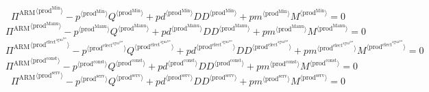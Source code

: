 \begin{equation}
{\Pi^{\mathrm{ARM}}}^{\langle \mathrm{prod}^{\mathrm{Min}}\rangle} - {{p}^{\langle \mathrm{prod}^{\mathrm{Min}}\rangle}} {{Q}^{\langle \mathrm{prod}^{\mathrm{Min}}\rangle}} + {{{p\!d}}^{\langle \mathrm{prod}^{\mathrm{Min}}\rangle}} {{{D\!D}}^{\langle \mathrm{prod}^{\mathrm{Min}}\rangle}} + {{{p\!m}}^{\langle \mathrm{prod}^{\mathrm{Min}}\rangle}} {{M}^{\langle \mathrm{prod}^{\mathrm{Min}}\rangle}} = 0
\end{equation}
\begin{equation}
{\Pi^{\mathrm{ARM}}}^{\langle \mathrm{prod}^{\mathrm{Manu}}\rangle} - {{p}^{\langle \mathrm{prod}^{\mathrm{Manu}}\rangle}} {{Q}^{\langle \mathrm{prod}^{\mathrm{Manu}}\rangle}} + {{{p\!d}}^{\langle \mathrm{prod}^{\mathrm{Manu}}\rangle}} {{{D\!D}}^{\langle \mathrm{prod}^{\mathrm{Manu}}\rangle}} + {{{p\!m}}^{\langle \mathrm{prod}^{\mathrm{Manu}}\rangle}} {{M}^{\langle \mathrm{prod}^{\mathrm{Manu}}\rangle}} = 0
\end{equation}
\begin{equation}
{\Pi^{\mathrm{ARM}}}^{\langle \mathrm{prod}^{\mathrm{elect}^{\mathrm{agua}^{\mathrm{gas}}}}\rangle} - {{p}^{\langle \mathrm{prod}^{\mathrm{elect}^{\mathrm{agua}^{\mathrm{gas}}}}\rangle}} {{Q}^{\langle \mathrm{prod}^{\mathrm{elect}^{\mathrm{agua}^{\mathrm{gas}}}}\rangle}} + {{{p\!d}}^{\langle \mathrm{prod}^{\mathrm{elect}^{\mathrm{agua}^{\mathrm{gas}}}}\rangle}} {{{D\!D}}^{\langle \mathrm{prod}^{\mathrm{elect}^{\mathrm{agua}^{\mathrm{gas}}}}\rangle}} + {{{p\!m}}^{\langle \mathrm{prod}^{\mathrm{elect}^{\mathrm{agua}^{\mathrm{gas}}}}\rangle}} {{M}^{\langle \mathrm{prod}^{\mathrm{elect}^{\mathrm{agua}^{\mathrm{gas}}}}\rangle}} = 0
\end{equation}
\begin{equation}
{\Pi^{\mathrm{ARM}}}^{\langle \mathrm{prod}^{\mathrm{const}}\rangle} - {{p}^{\langle \mathrm{prod}^{\mathrm{const}}\rangle}} {{Q}^{\langle \mathrm{prod}^{\mathrm{const}}\rangle}} + {{{p\!d}}^{\langle \mathrm{prod}^{\mathrm{const}}\rangle}} {{{D\!D}}^{\langle \mathrm{prod}^{\mathrm{const}}\rangle}} + {{{p\!m}}^{\langle \mathrm{prod}^{\mathrm{const}}\rangle}} {{M}^{\langle \mathrm{prod}^{\mathrm{const}}\rangle}} = 0
\end{equation}
\begin{equation}
{\Pi^{\mathrm{ARM}}}^{\langle \mathrm{prod}^{\mathrm{serv}}\rangle} - {{p}^{\langle \mathrm{prod}^{\mathrm{serv}}\rangle}} {{Q}^{\langle \mathrm{prod}^{\mathrm{serv}}\rangle}} + {{{p\!d}}^{\langle \mathrm{prod}^{\mathrm{serv}}\rangle}} {{{D\!D}}^{\langle \mathrm{prod}^{\mathrm{serv}}\rangle}} + {{{p\!m}}^{\langle \mathrm{prod}^{\mathrm{serv}}\rangle}} {{M}^{\langle \mathrm{prod}^{\mathrm{serv}}\rangle}} = 0
\end{equation}
